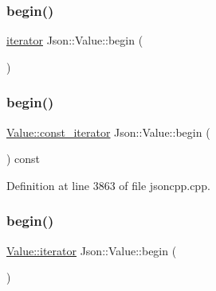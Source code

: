 \hypertarget{class_json_1_1_value_acec156770bf554bee85279825d046fad}{}\label{class_json_1_1_value_acec156770bf554bee85279825d046fad} 
\subsubsection{\texorpdfstring{begin()}{begin()}\hspace{0.1cm}{\footnotesize\ttfamily [2/4]}}
{\footnotesize\ttfamily \hyperlink{class_json_1_1_value_a341cdf2e01f8b3c5b7317aa2f0768c53}{iterator} Json\+::\+Value\+::begin (\begin{DoxyParamCaption}{ }\end{DoxyParamCaption})}

\hypertarget{class_json_1_1_value_a015459a3950c198d63a2d3be8f5ae296}{}\label{class_json_1_1_value_a015459a3950c198d63a2d3be8f5ae296} 
\subsubsection{\texorpdfstring{begin()}{begin()}\hspace{0.1cm}{\footnotesize\ttfamily [3/4]}}
{\footnotesize\ttfamily \hyperlink{class_json_1_1_value_af92282ca92b58b320debd486afb7696a}{Value\+::const\+\_\+iterator} Json\+::\+Value\+::begin (\begin{DoxyParamCaption}{ }\end{DoxyParamCaption}) const}



Definition at line 3863 of file jsoncpp.\+cpp.

\hypertarget{class_json_1_1_value_a2d45bb2e68e8f22fe356d7d955ebd3c9}{}\label{class_json_1_1_value_a2d45bb2e68e8f22fe356d7d955ebd3c9} 
\subsubsection{\texorpdfstring{begin()}{begin()}\hspace{0.1cm}{\footnotesize\ttfamily [4/4]}}
{\footnotesize\ttfamily \hyperlink{class_json_1_1_value_a341cdf2e01f8b3c5b7317aa2f0768c53}{Value\+::iterator} Json\+::\+Value\+::begin (\begin{DoxyParamCaption}{ }\end{DoxyParamCaption})}



